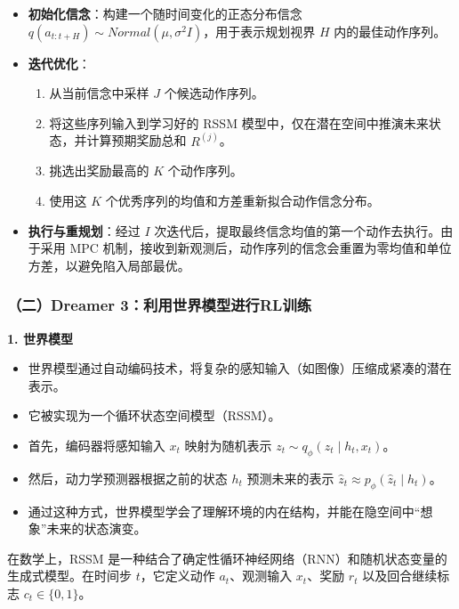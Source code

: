 \begin{itemize}
\tightlist
\item
  \textbf{初始化信念}：构建一个随时间变化的正态分布信念 \(q(a_{t:t+H}) \sim Normal(\mu, \sigma^2 I)\)，用于表示规划视界 \(H\) 内的最佳动作序列。
\item
  \textbf{迭代优化}：

  \begin{enumerate}
  \def\labelenumi{\arabic{enumi}.}
  \tightlist
  \item
    从当前信念中采样 \(J\) 个候选动作序列。
  \item
    将这些序列输入到学习好的 RSSM 模型中，仅在潜在空间中推演未来状态，并计算预期奖励总和 \(R^{(j)}\)。
  \item
    挑选出奖励最高的 \(K\) 个动作序列。
  \item
    使用这 \(K\) 个优秀序列的均值和方差重新拟合动作信念分布。
  \end{enumerate}
\item
  \textbf{执行与重规划}：经过 \(I\) 次迭代后，提取最终信念均值的第一个动作去执行。由于采用 MPC 机制，接收到新观测后，动作序列的信念会重置为零均值和单位方差，以避免陷入局部最优。
\end{itemize}

\hypertarget{ux4e8cdreamer-3ux5229ux7528ux4e16ux754cux6a21ux578bux8fdbux884crlux8badux7ec3}{%
\subsubsection{（二）Dreamer 3：利用世界模型进行RL训练}\label{ux4e8cdreamer-3ux5229ux7528ux4e16ux754cux6a21ux578bux8fdbux884crlux8badux7ec3}}

\textbf{1. 世界模型}

\begin{itemize}
\tightlist
\item
  世界模型通过自动编码技术，将复杂的感知输入（如图像）压缩成紧凑的潜在表示。
\item
  它被实现为一个循环状态空间模型（RSSM）。
\item
  首先，编码器将感知输入 \(x_t\) 映射为随机表示 \(z_t \sim q_{\phi}(z_t \mid h_t, x_t)\)。
\item
  然后，动力学预测器根据之前的状态 \(h_t\) 预测未来的表示 \(\hat{z}_t \approx p_{\phi}(\hat{z}_t \mid h_t)\)。
\item
  通过这种方式，世界模型学会了理解环境的内在结构，并能在隐空间中``想象''未来的状态演变。
\end{itemize}

在数学上，RSSM 是一种结合了确定性循环神经网络（RNN）和随机状态变量的生成式模型。在时间步 \(t\)，它定义动作 \(a_t\)、观测输入 \(x_t\)、奖励 \(r_t\) 以及回合继续标志 \(c_t \in \{0, 1\}\)。

